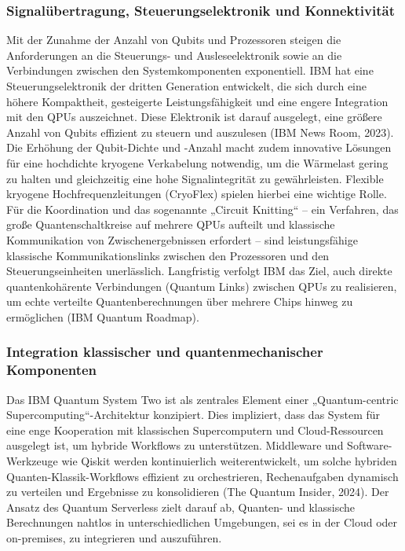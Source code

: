 \subsubsection{Signalübertragung, Steuerungselektronik und Konnektivität}
Mit der Zunahme der Anzahl von Qubits und Prozessoren steigen die Anforderungen an die Steuerungs- und Ausleseelektronik sowie an die Verbindungen zwischen den Systemkomponenten exponentiell. IBM hat eine Steuerungselektronik der dritten Generation entwickelt, die sich durch eine höhere Kompaktheit, gesteigerte Leistungsfähigkeit und eine engere Integration mit den QPUs auszeichnet. Diese Elektronik ist darauf ausgelegt, eine größere Anzahl von Qubits effizient zu steuern und auszulesen (IBM News Room, 2023). Die Erhöhung der Qubit-Dichte und -Anzahl macht zudem innovative Lösungen für eine hochdichte kryogene Verkabelung notwendig, um die Wärmelast gering zu halten und gleichzeitig eine hohe Signalintegrität zu gewährleisten. Flexible kryogene Hochfrequenzleitungen (CryoFlex) spielen hierbei eine wichtige Rolle. Für die Koordination und das sogenannte „Circuit Knitting“ – ein Verfahren, das große Quantenschaltkreise auf mehrere QPUs aufteilt und klassische Kommunikation von Zwischenergebnissen erfordert – sind leistungsfähige klassische Kommunikationslinks zwischen den Prozessoren und den Steuerungseinheiten unerlässlich. Langfristig verfolgt IBM das Ziel, auch direkte quantenkohärente Verbindungen (Quantum Links) zwischen QPUs zu realisieren, um echte verteilte Quantenberechnungen über mehrere Chips hinweg zu ermöglichen (IBM Quantum Roadmap).

\subsubsection{Integration klassischer und quantenmechanischer Komponenten}
Das IBM Quantum System Two ist als zentrales Element einer „Quantum-centric Supercomputing“-Architektur konzipiert. Dies impliziert, dass das System für eine enge Kooperation mit klassischen Supercomputern und Cloud-Ressourcen ausgelegt ist, um hybride Workflows zu unterstützen. Middleware und Software-Werkzeuge wie Qiskit werden kontinuierlich weiterentwickelt, um solche hybriden Quanten-Klassik-Workflows effizient zu orchestrieren, Rechenaufgaben dynamisch zu verteilen und Ergebnisse zu konsolidieren (The Quantum Insider, 2024). Der Ansatz des Quantum Serverless zielt darauf ab, Quanten- und klassische Berechnungen nahtlos in unterschiedlichen Umgebungen, sei es in der Cloud oder on-premises, zu integrieren und auszuführen.

